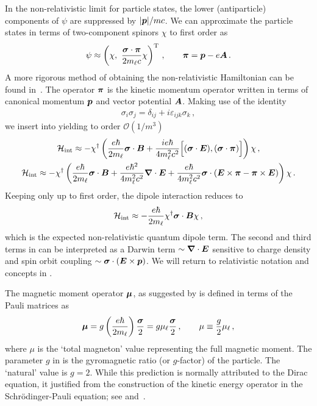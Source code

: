 In the non-relativistic limit for particle states, the lower (antiparticle) components of $\psi$ are suppressed by $|\boldsymbol{p}|/mc$. We can approximate the particle states in terms of two-component spinors $\chi$ to first order as
\begin{align}
    \label{approx:1}
    \psi\approx\left(\chi,\ \frac{\bb{\sigma}\cdot\bb{\pi}}{2m_{\ell}c}\chi\right)^\mathrm{T}\,,\qquad \bb{\pi}=\bb{p}-e\bb{A}\,.
\end{align}
A more rigorous method of obtaining the non-relativistic Hamiltonian can be found in~\cite{Foldy:1949wa}. The operator $\boldsymbol{\pi}$ is the kinetic momentum operator written in terms of canonical momentum $\boldsymbol{p}$ and vector potential $\boldsymbol{A}$. Making use of the identity
\begin{align}
    \sigma_{i}\sigma_{j} = \delta_{ij} + i\varepsilon_{ijk}\sigma_{k}\,,
\end{align}
we insert  into  yielding to order $\mathcal{O}(1/m^{3})$
\begin{gather}
    \label{ham:1}
    \mathcal{H}_\mathrm{int} \approx -\chi^{\dag}\left(\frac{e\hbar}{2m_{\ell}}\boldsymbol{\sigma}\cdot\boldsymbol{B}
    +\frac{ie\hbar}{4m_{\ell}^{2}c^{2}}\Big[(\boldsymbol{\sigma}\cdot\boldsymbol{E}),(\boldsymbol{\sigma}\cdot\boldsymbol{\pi})\Big]\right)\chi\,,\\
    \label{ham:2}
    \mathcal{H}_\mathrm{int} \approx -\chi^{\dag}\left(\frac{e\hbar}{2m_{\ell}}\boldsymbol{\sigma}\cdot\boldsymbol{B}
    +\frac{e\hbar^{2}}{4m_{\ell}^{2}c^{2}}\boldsymbol{\nabla}\cdot\boldsymbol{E}
    +\frac{e\hbar}{4m_{\ell}^{2}c^{2}}\boldsymbol{\sigma}\cdot\left(\boldsymbol{E}\times\boldsymbol{\pi}-\boldsymbol{\pi}\times\boldsymbol{E}\right)\right)\chi\,.
\end{gather}
Keeping only up to first order, the dipole interaction  reduces to 
\begin{gather}
	\label{pauli:3}
    \mathcal{H}_\mathrm{int} \approx -\frac{e\hbar}{2m_{\ell}}\chi^{\dag}\boldsymbol{\sigma}\cdot\boldsymbol{B}\chi\,,
\end{gather}
which is the expected non-relativistic quantum dipole term. The second and third terms in  can be interpreted as a Darwin term $\sim\boldsymbol{\nabla}\cdot\boldsymbol{E}$ sensitive to charge density and spin orbit coupling $\sim\boldsymbol{\sigma}\cdot(\boldsymbol{E}\times\boldsymbol{p})$. We will return to relativistic notation and concepts in .

The magnetic moment operator $\boldsymbol{\mu}$, as suggested by  is defined in terms of the Pauli matrices as
\begin{gather}
    \label{mag:3}
    \boldsymbol{\mu}=g\left(\frac{e\hbar}{2m_{\ell}}\right)\frac{\boldsymbol{\sigma}}{2}=g\mu_{\ell}\frac{\boldsymbol{\sigma}}{2}\,,\qquad\mu\equiv\frac{g}{2}\mu_{\ell}\,,
\end{gather}
where $\mu$ is the `total magneton' value representing the full magnetic moment. The parameter $g$ in  is the gyromagnetic ratio (or $g$-factor) of the particle. The `natural' value is $g\!=\!2$. While this prediction is normally attributed to the Dirac equation, it justified from the construction of the kinetic energy operator in the Schr{\"o}dinger-Pauli equation; see  and~\cite{sakurai1967advanced}.

